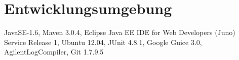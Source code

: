 \section{Entwicklungsumgebung}\label{Entwicklungsumgebung}
JavaSE-1.6, Maven 3.0.4, Eclipse Java EE IDE for Web Developers (Juno) Ser\-vice Release 1, Ubuntu 12.04, JUnit 4.8.1, Google Guice 3.0, AgilentLogCompiler, Git 1.7.9.5